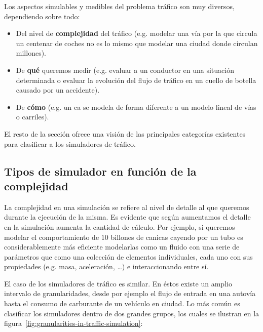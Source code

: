 Los aspectos simulables y medibles del problema tráfico son muy diversos, dependiendo sobre todo:

\begin{itemize}
	\item Del nivel de \textbf{complejidad} del tráfico (e.g. modelar una vía por la que circula un centenar de coches no es lo mismo que modelar una ciudad donde circulan millones).
	\item De \textbf{qué} queremos medir (e.g. evaluar a un conductor en una situación determinada o evaluar la evolución del flujo de tráfico en un cuello de botella causado por un accidente).
	\item De \textbf{cómo} (e.g. un \ac{ca} se modela de forma diferente a un modelo lineal de vías o carriles).
\end{itemize}

El resto de la sección ofrece una visión de las principales categorías existentes para clasificar a los simuladores de tráfico.

\subsection{Tipos de simulador en función de la complejidad}

La complejidad en una simulación se refiere al nivel de detalle al que queremos durante la ejecución de la misma. Es evidente que según aumentamos el detalle en la simulación aumenta la cantidad de cálculo. Por ejemplo, si queremos modelar el comportamiento de $10$ billones de canicas cayendo por un tubo es considerablemente más eficiente modelarlas como un fluido con una serie de parámetros que como una colección de elementos individuales, cada uno con sus propiedades (e.g. masa, aceleración, \ldots) e interaccionando entre sí.

El caso de los simuladores de tráfico es similar. En éstos existe un amplio intervalo de granularidades, desde por ejemplo el flujo de entrada en una autovía hasta el consumo de carburante de un vehículo en ciudad. Lo más común es clasificar los simuladores dentro de dos grandes grupos, los cuales se ilustran en la figura~\ref{fig:granularities-in-traffic-simulation}:

